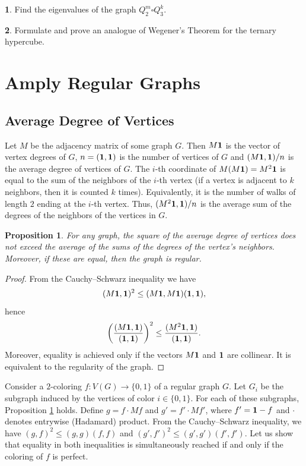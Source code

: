 \documentclass[11pt]{article}
\newtheorem{claim}{Proposition}[section]
\theoremstyle{definition}
\newtheorem{exercise}{\quad}
\begin{document}
\begin{exercise}
Find the eigenvalues of the graph $Q^m_2\square Q^k_3$.
\end{exercise}

\begin{exercise}
Formulate and prove an analogue of Wegener's Theorem for the ternary hypercube.
\end{exercise}



\section{Amply Regular Graphs}\label{3.3}

\subsection{Average Degree of Vertices}

Let $M$ be the adjacency matrix of some graph
$G$. Then $M{\bf1}$
is the vector of vertex degrees of $G$, $n=({\bf1},{\bf1})$ is the number of vertices of $G$
and $(M{\bf1},{\bf1})/n$ is the average  degree of vertices of $G$.  The $i$-th coordinate of 
$M(M{\bf1})=M^2{\bf1}$ is equal to the sum  of the  neighbors
of the $i$-th vertex (if a vertex is adjacent  to $k$ neighbors, then it
is counted $k$ times). 
Equivalently, it is the number of walks of length $2$ ending at the $i$-th vertex.
 Thus, $(M^2{\bf1},{\bf1})/n$ is
the average sum of the degrees of the neighbors of the vertices in  $G$.

\begin{claim}\label{KBclaim}
For any graph, the square of the average degree of  vertices does not exceed
the average of the sums of the degrees of the vertex's neighbors. Moreover, if these are equal, then
the graph is regular. \end{claim}
\begin{proof}
From the Cauchy--Schwarz inequality we have
$$(M{\bf1},{\bf1})^2\leq (M{\bf1},M{\bf1})({\bf1},{\bf1}),$$ hence
$$\left(\frac{(M{\bf1},{\bf1})}{({\bf1},{\bf1})}\right)^2\leq
\frac{(M^2{\bf1},{\bf1})}{({\bf1},{\bf1})}.$$ Moreover, equality
is achieved only if the vectors $M{\bf1}$ and ${\bf1}$ are collinear.
It is equivalent to the regularity of the graph.
\end{proof}

Consider a $2$-coloring $f:V(G)\rightarrow \{0,1\}$ of a regular graph
$G$. Let $G_i$ be the subgraph induced by the vertices
of color $i\in \{0,1\}$. For each of these subgraphs, Proposition \ref{KBclaim} holds. Define $g=f\cdot Mf$ and
$g'=f'\cdot Mf'$, where $f'={\bf 1}-f$ and  $\cdot$ denotes
 entrywise (Hadamard) product. From the Cauchy--Schwarz inequality, we have $(g,f)^2\leq
(g,g)(f,f)$ and $(g',f')^2\leq (g',g')(f',f')$. Let us show that equality in both inequalities is simultaneously reached if and only if the coloring of $f$ is perfect.
\end{document}
